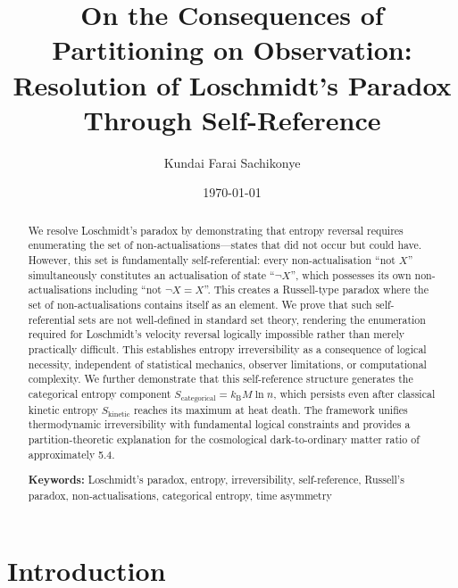 \documentclass[twocolumn,10pt]{article}
\theoremstyle{definition}
\theoremstyle{remark}
\newcommand{\kB}{k_{\text{B}}}
\newcommand{\Scat}{S_{\text{categorical}}}
\newcommand{\Skin}{S_{\text{kinetic}}}
\begin{document}
\title{\vspace{-1cm}\textbf{On the Consequences of Partitioning on Observation: Resolution of Loschmidt's Paradox Through Self-Reference}}

\author[1]{Kundai Farai Sachikonye}

\date{\today}

\maketitle

\begin{abstract}
\noindent We resolve Loschmidt's paradox by demonstrating that entropy reversal requires enumerating the set of non-actualisations—states that did not occur but could have. However, this set is fundamentally self-referential: every non-actualisation ``not $X$'' simultaneously constitutes an actualisation of state ``$\neg X$'', which possesses its own non-actualisations including ``not $\neg X = X$''. This creates a Russell-type paradox where the set of non-actualisations contains itself as an element. We prove that such self-referential sets are not well-defined in standard set theory, rendering the enumeration required for Loschmidt's velocity reversal logically impossible rather than merely practically difficult. This establishes entropy irreversibility as a consequence of logical necessity, independent of statistical mechanics, observer limitations, or computational complexity. We further demonstrate that this self-reference structure generates the categorical entropy component $\Scat = \kB M \ln n$, which persists even after classical kinetic entropy $\Skin$ reaches its maximum at heat death. The framework unifies thermodynamic irreversibility with fundamental logical constraints and provides a partition-theoretic explanation for the cosmological dark-to-ordinary matter ratio of approximately 5.4.

\vspace{0.3cm}
\noindent\textbf{Keywords:} Loschmidt's paradox, entropy, irreversibility, self-reference, Russell's paradox, non-actualisations, categorical entropy, time asymmetry
\end{abstract}

\section{Introduction}
\end{document}
